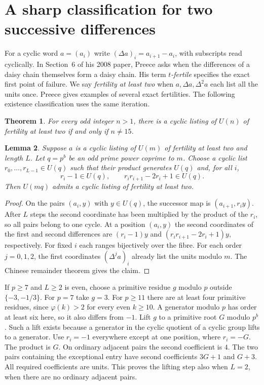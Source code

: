 \documentclass[11pt,a4paper]{article}
\newtheorem{theorem}{Theorem}[section]
\newtheorem{lemma}[theorem]{Lemma}
\newcommand{\U}{U}
\begin{document}
\section{A sharp classification for two successive differences}
\label{sec:two-differences}

For a cyclic word $a=(a_i)$ write $(\Delta a)_i=a_{i+1}-a_i$, with subscripts read cyclically. In Section~6 of his 2008 paper, Preece \cite{preece08} asks when the differences of a daisy chain themselves form a daisy chain. His term \emph{$t$-fertile} specifies the exact first point of failure. We say \emph{fertility at least two} when $a,\Delta a,\Delta^2a$ each list all the units once. Preece gives examples of several exact fertilities. The following existence classification uses the same iteration.

\begin{theorem}\label{thm:two-orders}
For every odd integer $n>1$, there is a cyclic listing of $\U(n)$ of fertility at least two if and only if $n\ne15$.
\end{theorem}

\begin{lemma}\label{lem:two-fibre}
Suppose $a$ is a cyclic listing of $\U(m)$ of fertility at least two and length $L$. Let $q=p^b$ be an odd prime power coprime to $m$. Choose a cyclic list $r_0,\ldots,r_{L-1}\in\U(q)$ such that their product generates $\U(q)$ and, for all $i$,
\[
 r_i-1\in\U(q),\qquad r_ir_{i+1}-2r_i+1\in\U(q).
\]
Then $\U(mq)$ admits a cyclic listing of fertility at least two.
\end{lemma}

\begin{proof}
On the pairs $(a_i,y)$ with $y\in\U(q)$, the successor map is $(a_{i+1},r_i y)$. After $L$ steps the second coordinate has been multiplied by the product of the $r_i$, so all pairs belong to one cycle. At a position $(a_i,y)$ the second coordinates of the first and second differences are $(r_i-1)y$ and $(r_i r_{i+1}-2r_i+1)y$, respectively. For fixed $i$ each ranges bijectively over the fibre. For each order $j=0,1,2$, the first coordinates $(\Delta^j a)_i$ already list the units modulo $m$. The Chinese remainder theorem gives the claim.
\end{proof}

If $p\ge7$ and $L\ge2$ is even, choose a primitive residue $g$ modulo $p$ outside $\{-3,-1/3\}$. For $p=7$ take $g=3$. For $p\ge11$ there are at least four primitive residues, since $\varphi(k)>2$ for every even $k\ge10$. A generator modulo $p$ has order at least six here, so it also differs from $-1$. Lift $g$ to a primitive root $G$ modulo $p^b$. Such a lift exists because a generator in the cyclic quotient of a cyclic group lifts to a generator. Use $r_i=-1$ everywhere except at one position, where $r_i=-G$. The product is $G$. On ordinary adjacent pairs the second coefficient is $4$. The two pairs containing the exceptional entry have second coefficients $3G+1$ and $G+3$. All required coefficients are units. This proves the lifting step also when $L=2$, when there are no ordinary adjacent pairs.
\end{document}
